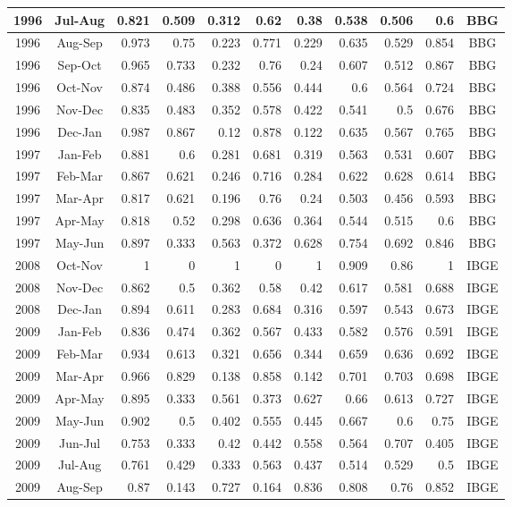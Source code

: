 \documentclass[11pt]{article}
\begin{document}
\begin{table}[h]
{\begin{tabular}{|c|c|r|r|r|r|r|r|r|r|c|}
1996 & Jul-Aug & 0.821 & 0.509 & 0.312 & 0.62   & 0.38   & 0.538 & 0.506 & 0.6   & BBG  \\ \hline
1996 & Aug-Sep & 0.973 & 0.75  & 0.223 & 0.771  & 0.229  & 0.635 & 0.529 & 0.854 & BBG  \\ \hline
1996 & Sep-Oct & 0.965 & 0.733 & 0.232 & 0.76   & 0.24   & 0.607 & 0.512 & 0.867 & BBG  \\ \hline
1996 & Oct-Nov & 0.874 & 0.486 & 0.388 & 0.556  & 0.444  & 0.6   & 0.564 & 0.724 & BBG  \\ \hline
1996 & Nov-Dec & 0.835 & 0.483 & 0.352 & 0.578  & 0.422  & 0.541 & 0.5   & 0.676 & BBG  \\ \hline
1996 & Dec-Jan & 0.987 & 0.867 & 0.12  & 0.878  & 0.122  & 0.635 & 0.567 & 0.765 & BBG  \\ \hline
1997 & Jan-Feb & 0.881 & 0.6   & 0.281 & 0.681  & 0.319  & 0.563 & 0.531 & 0.607 & BBG  \\ \hline
1997 & Feb-Mar & 0.867 & 0.621 & 0.246 & 0.716  & 0.284  & 0.622 & 0.628 & 0.614 & BBG  \\ \hline
1997 & Mar-Apr & 0.817 & 0.621 & 0.196 & 0.76   & 0.24   & 0.503 & 0.456 & 0.593 & BBG  \\ \hline
1997 & Apr-May & 0.818 & 0.52  & 0.298 & 0.636  & 0.364  & 0.544 & 0.515 & 0.6   & BBG  \\ \hline
1997 & May-Jun & 0.897 & 0.333 & 0.563 & 0.372  & 0.628  & 0.754 & 0.692 & 0.846 & BBG  \\ \hline
2008 & Oct-Nov & 1     & 0     & 1     & 0      & 1      & 0.909 & 0.86  & 1     & IBGE \\ \hline
2008 & Nov-Dec & 0.862 & 0.5   & 0.362 & 0.58   & 0.42   & 0.617 & 0.581 & 0.688 & IBGE \\ \hline
2008 & Dec-Jan & 0.894 & 0.611 & 0.283 & 0.684  & 0.316  & 0.597 & 0.543 & 0.673 & IBGE \\ \hline
2009 & Jan-Feb & 0.836 & 0.474 & 0.362 & 0.567  & 0.433  & 0.582 & 0.576 & 0.591 & IBGE \\ \hline
2009 & Feb-Mar & 0.934 & 0.613 & 0.321 & 0.656  & 0.344  & 0.659 & 0.636 & 0.692 & IBGE \\ \hline
2009 & Mar-Apr & 0.966 & 0.829 & 0.138 & 0.858  & 0.142  & 0.701 & 0.703 & 0.698 & IBGE \\ \hline
2009 & Apr-May & 0.895 & 0.333 & 0.561 & 0.373  & 0.627  & 0.66  & 0.613 & 0.727 & IBGE \\ \hline
2009 & May-Jun & 0.902 & 0.5   & 0.402 & 0.555  & 0.445  & 0.667 & 0.6   & 0.75  & IBGE \\ \hline
2009 & Jun-Jul & 0.753 & 0.333 & 0.42  & 0.442  & 0.558  & 0.564 & 0.707 & 0.405 & IBGE \\ \hline
2009 & Jul-Aug & 0.761 & 0.429 & 0.333 & 0.563  & 0.437  & 0.514 & 0.529 & 0.5   & IBGE \\ \hline
2009 & Aug-Sep & 0.87  & 0.143 & 0.727 & 0.164  & 0.836  & 0.808 & 0.76  & 0.852 & IBGE \\ \hline
\end{tabular}%
}
\end{table}
\end{document}
